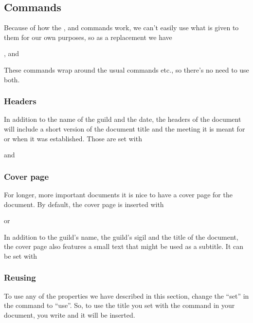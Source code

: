 \documentclass[a4paper, oneside]{ltxdoc}
\begin{document}
\subsection{Commands}
Because of how the ,  and  commands work, we can't
easily use what is given to them for our own purposes, so as a replacement we
have
\begin{center}
  ,  and 
\end{center}

These commands wrap around the usual  commands etc., so there's no
need to use both.

\subsubsection{Headers}
In addition to the name of the guild and the date, the headers of the document
will include a short version of the document title and the meeting it is meant
for or when it was established.  Those are set with

\begin{center}
   and 
\end{center}

\subsubsection{Cover page}
For longer, more important documents it is nice to have a cover page for the
document.  By default, the cover page is inserted with

\begin{center}
   or 
\end{center}

In addition to the guild's name, the guild's sigil and the title of the
document, the cover page also features a small text that might be used as a
subtitle.  It can be set with

\begin{center}
\end{center}

\subsubsection{Reusing}
To use any of the properties we have described in this section, change the
``set'' in the command to ``use''.  So, to use the title you set with the
 command in your document, you write  and it will be
inserted.
\end{document}
